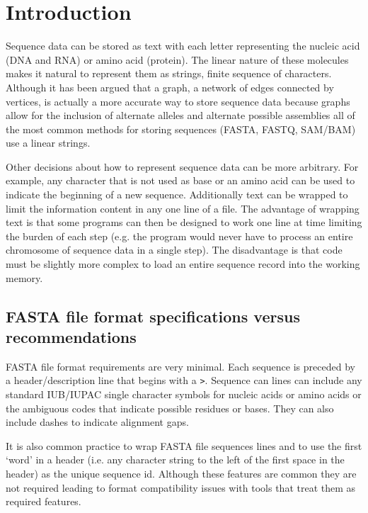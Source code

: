 \section{Introduction}

Sequence data can be stored as text with each letter representing the nucleic acid (DNA and RNA) or amino acid (protein). The linear nature of these molecules makes it natural to represent them as strings, finite sequence of characters. Although it has been argued that a graph, a network of edges connected by vertices, is actually a more accurate way to store sequence data because graphs allow for the inclusion of alternate alleles and alternate possible assemblies \cite{jaffe2012fastg} all of the most common methods for storing sequences (FASTA, FASTQ, SAM/BAM) use a linear strings.

Other decisions about how to represent sequence data can be more arbitrary. For example, any character that is not used as base or an amino acid can be used to indicate the beginning of a new sequence. Additionally text can be wrapped to limit the information content in any one line of a file. The advantage of wrapping text is that some programs can then be designed to work one line at time limiting the burden of each step (e.g. the program would never have to process an entire chromosome of sequence data in a single step). The disadvantage is that code must be slightly more complex to load an entire sequence record into the working memory.

\subsection{FASTA file format specifications versus recommendations}

FASTA file format requirements are very minimal. Each sequence is preceded by a header/description line that begins with a \verb|>|. Sequence can lines can include any standard IUB/IUPAC single character symbols for nucleic acids or amino acids or the ambiguous codes that indicate possible residues or bases. They can also include dashes to indicate alignment gaps. 

It is also common practice to wrap FASTA file sequences lines and to use the first `word' in a header (i.e. any character string to the left of the first space in the header) as the unique sequence id. Although these features are common they are not required leading to format compatibility issues with tools that treat them as required features.


